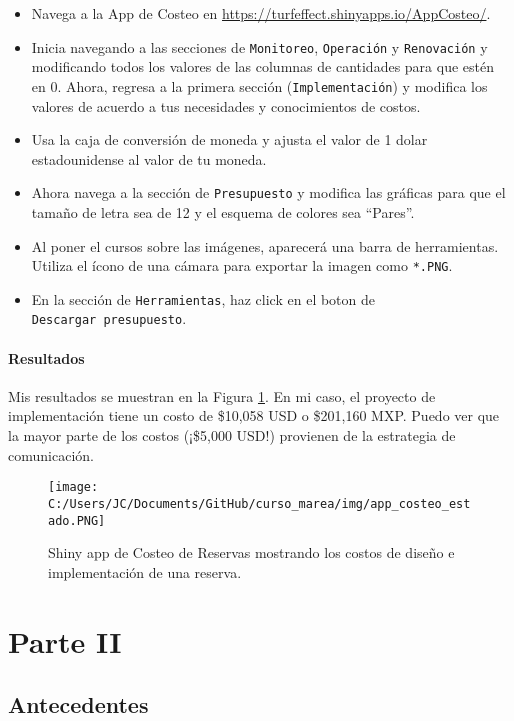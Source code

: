 \documentclass[]{krantz}
\begin{document}
\begin{itemize}
\item
  Navega a la App de Costeo en \url{https://turfeffect.shinyapps.io/AppCosteo/}.
\item
  Inicia navegando a las secciones de \texttt{Monitoreo}, \texttt{Operación} y \texttt{Renovación} y modificando todos los valores de las columnas de cantidades para que estén en 0. Ahora, regresa a la primera sección (\texttt{Implementación}) y modifica los valores de acuerdo a tus necesidades y conocimientos de costos.
\item
  Usa la caja de conversión de moneda y ajusta el valor de 1 dolar estadounidense al valor de tu moneda.
\item
  Ahora navega a la sección de \texttt{Presupuesto} y modifica las gráficas para que el tamaño de letra sea de 12 y el esquema de colores sea ``Pares''.
\item
  Al poner el cursos sobre las imágenes, aparecerá una barra de herramientas. Utiliza el ícono de una cámara para exportar la imagen como \texttt{*.PNG}.
\item
  En la sección de \texttt{Herramientas}, haz click en el boton de \texttt{Descargar\ presupuesto}.
\end{itemize}

\hypertarget{resultados}{%
\subsection{Resultados}\label{resultados}}

Mis resultados se muestran en la Figura \ref{fig:resultados-costeo}. En mi caso, el proyecto de implementación tiene un costo de \$10,058 USD o \$201,160 MXP. Puedo ver que la mayor parte de los costos (¡\$5,000 USD!) provienen de la estrategia de comunicación.

\begin{figure}
\centering
\texttt{[image: C:/Users/JC/Documents/GitHub/curso\_marea/img/app\_costeo\_estado.PNG]}
\caption{\label{fig:resultados-costeo}Shiny app de Costeo de Reservas mostrando los costos de diseño e implementación de una reserva.}
\end{figure}

\hypertarget{part-parte-ii}{%
\part{Parte II}\label{part-parte-ii}}

\hypertarget{antecedentes}{%
\chapter{Antecedentes}\label{antecedentes}}
\end{document}
